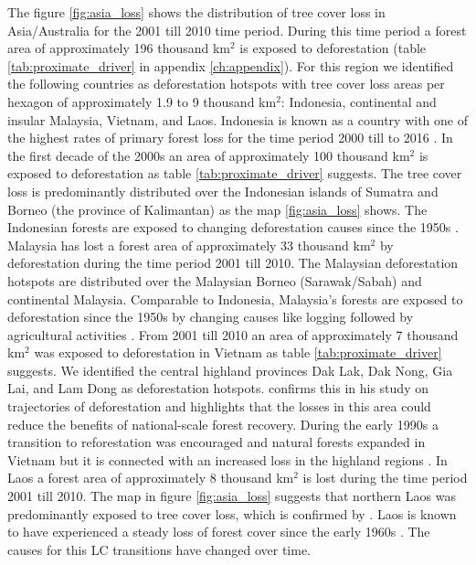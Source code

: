			The figure \ref{fig:asia_loss} shows the distribution of tree cover loss in Asia/Australia for the 2001 till 2010 time period. During this time period a forest area of approximately 196 thousand km$^2$ is exposed to deforestation (table \ref{tab:proximate_driver} in appendix \ref{ch:appendix}). For this region we identified the following countries as deforestation hotspots with tree cover loss areas per hexagon of approximately 1.9 to 9 thousand km$^2$: Indonesia, continental and insular Malaysia, Vietnam, and Laos. Indonesia is known as a country with one of the highest rates of primary forest loss for the time period 2000 till to 2016 \citep{Austin2019}. In the first decade of the 2000s an area of approximately 100 thousand km$^2$ is exposed to deforestation as table \ref{tab:proximate_driver} suggests. The tree cover loss is predominantly distributed over the Indonesian islands of Sumatra and Borneo (the province of Kalimantan) as the map \ref{fig:asia_loss} shows. The Indonesian forests are exposed to changing deforestation causes since the 1950s \citep{Nawir2007}. Malaysia has lost a forest area of approximately 33 thousand km$^2$ by deforestation during the time period 2001 till 2010. The  Malaysian deforestation hotspots are distributed over the Malaysian Borneo (Sarawak/Sabah) and continental Malaysia. Comparable to Indonesia, Malaysia's forests are exposed to deforestation since the 1950s by changing causes like logging followed by agricultural activities \citep{Kummer1994}. From 2001 till 2010 an area of approximately 7 thousand km$^2$ was exposed to deforestation in Vietnam as table \ref{tab:proximate_driver} suggests. We identified the central highland provinces Dak Lak, Dak Nong, Gia Lai, and Lam Dong as deforestation hotspots. \citet{Meyfroidt2013} confirms this in his study on trajectories of deforestation and highlights that the losses in this area could reduce the benefits of national-scale forest recovery. During the early 1990s a transition to reforestation was encouraged and natural forests expanded in Vietnam but it is connected with an increased loss in the highland regions \citep{Meyfroidt2013,Chazdon2008}. In Laos a forest area of approximately 8 thousand km$^2$ is lost during the time period 2001 till 2010. The map in figure \ref{fig:asia_loss} suggests that northern Laos was predominantly exposed to tree cover loss, which is confirmed by \citet{Hirsch2000}. Laos is known to have experienced a steady loss of forest cover since the early 1960s \citep{Hirsch2000}. The causes for this \ac{LC} transitions have changed over time.
